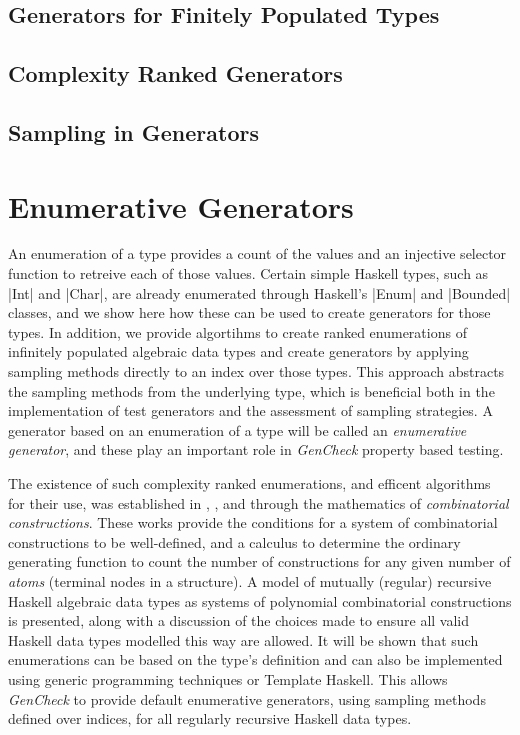 \documentclass[11pt]{report}
\newcommand{\GC}{\textit{GenCheck}\xspace}
\begin{document}
\section{Generators for Finitely Populated Types}\label{adtgen}


\section{Complexity Ranked Generators}\label{complexgen}


\section{Sampling in Generators}





\setcounter{figure}{0}
\setcounter{equation}{0}
\setcounter{table}{0}
\chapter{Enumerative Generators}\label{chp:enumgen}

An enumeration of a type provides a count of the values
and an injective selector function to retreive each of those values.
Certain simple Haskell types, such as |Int| and |Char|, 
are already enumerated through Haskell's |Enum| and |Bounded| classes,
and we show here how these can be used to create generators for those types.
In addition, we provide algortihms to create ranked enumerations of 
infinitely populated algebraic data types and create generators by
applying sampling methods directly to an index over those types.
This approach abstracts the sampling methods from the underlying type,
which is beneficial both in the implementation of test generators
and the assessment of sampling strategies.
A generator based on an enumeration of a type will be called an \emph{enumerative generator},
and these play an important role in \GC property based testing.

The existence of such complexity ranked enumerations,
and efficent algorithms for their use,
was established in \cite{FlSaZi89b}, \cite{FlajoletZC94}, \cite{FlSa95} and \cite{FlajoletSedgewick2009} 
through the mathematics of \emph{combinatorial constructions}.
These works provide the conditions for a system of combinatorial constructions to be well-defined,
and a calculus to determine the ordinary generating function to count the number of constructions
for any given number of \emph{atoms} (terminal nodes in a structure).
A model of mutually (regular) recursive Haskell algebraic data types
as systems of polynomial combinatorial constructions is presented,
along with a discussion of the choices made to ensure 
all valid Haskell data types modelled this way are allowed.
It will be shown that such enumerations can be based on the type's definition and
can also be implemented using generic programming techniques or Template Haskell.
This allows \GC to provide default enumerative generators,
using sampling methods defined over indices,
for all regularly recursive Haskell data types.
\end{document}

